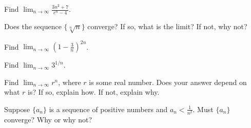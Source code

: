 \documentclass{exam}[12pt]
\begin{document}
\pagestyle{head}

\extraheadheight{.3in}
\extrafootheight{-.3in} 


\vspace{.2in}
\large{
\begin{questions}


\question Find $\displaystyle \lim_{n\to\infty} \frac{3n^2+7}{e^n-4}$.
\vspace{1.5in}

\question Does the sequence $\{ \sqrt[n] n\}$ converge?  If so, what
is the limit?  If not, why not?
\vspace{3.5in}

\question Find $\displaystyle \lim_{n\to\infty} \left( 1 -\frac{3}{n}\right)^{2n}$.
\vspace{3.5in}

\question Find $\displaystyle \lim_{n\to\infty} 3^{1/n}$.
\vspace{2in}

\question Find $\displaystyle\lim_{n\to\infty} r^n$, where $r$ is some real number.
Does your answer depend on what $r$ is?  If so, explain how.  If not, 
explain why.

\vspace{4in}

\question Suppose $\{a_n\}$ is a sequence of positive numbers and $a_n <
\frac{1}{n^2}$.  Must $\{a_n\}$ converge?  Why or why not?




\end{questions}

}
\end{document}
